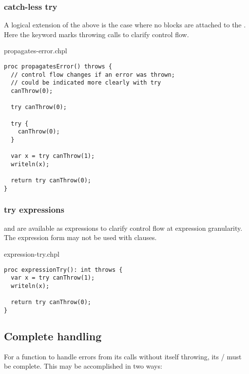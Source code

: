\subsubsection{catch-less try}
\label{catch_less_try}

A logical extension of the above is the case where no  blocks
are attached to the . Here the  keyword marks throwing
calls to clarify control flow.

\begin{chapelexample}{propagates-error.chpl}
\begin{chapel}
\begin{verbatim}
proc propagatesError() throws {
  // control flow changes if an error was thrown;
  // could be indicated more clearly with try
  canThrow(0);

  try canThrow(0);

  try {
    canThrow(0);
  }

  var x = try canThrow(1);
  writeln(x);

  return try canThrow(0);
}
\end{verbatim}
\end{chapel}
\end{chapelexample}

\subsubsection{try expressions}
\label{try_expressions}

 and  are available as expressions to clarify control flow
at expression granularity. The expression form may not be used with
 clauses.

\begin{chapelexample}{expression-try.chpl}
\begin{chapel}
\begin{verbatim}
proc expressionTry(): int throws {
  var x = try canThrow(1);
  writeln(x);

  return try canThrow(0);
}
\end{verbatim}
\end{chapel}
\end{chapelexample}

\subsection{Complete handling}
\label{Complete_handling}

For a function to handle errors from its calls without itself throwing,
its / must be complete. This may be accomplished
in two ways:

